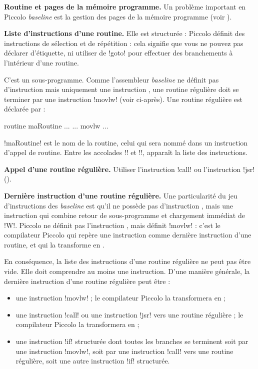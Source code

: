 \textbf{Routine et pages de la mémoire programme.} Un problème important en Piccolo \emph{baseline} est la gestion des pages de la mémoire programme (voir ).

\textbf{Liste d’instructions d’une routine.} Elle est structurée : Piccolo définit des instructions de sélection et de répétition : cela signifie que vous ne pouvez pas déclarer d’étiquette, ni utiliser de \pic!goto! pour effectuer des branchements à l’intérieur d’une routine.



C'est un sous-programme. Comme l'assembleur \emph{baseline} ne définit pas d'instruction  mais uniquement une instruction , une routine régulière doit se terminer par une instruction \pic!movlw! (voir ci-après). Une routine régulière est déclarée par :
\begin{piccolo}
routine maRoutine ... {
  ...
  movlw ...
}
\end{piccolo}

\pic!maRoutine! est le nom de la routine, celui qui sera nommé dans un instruction d’appel de routine. Entre les accolades \pic!{! et \pic!}!, apparaît la liste des instructions.

\textbf{Appel d’une routine régulière.} Utiliser l'instruction \pic!call! ou l'instruction \pic!jsr! ().

\textbf{Dernière instruction d’une routine régulière.} Une particularité du jeu d'instructions des \emph{baseline} est qu'il ne possède pas d'instruction , mais une instruction  qui combine retour de sous-programme et chargement immédiat de \pic!W!. Piccolo ne définit pas l'instruction , mais définit \pic!movlw! : c'est le compilateur Piccolo qui repère une instruction  comme dernière instruction d'une routine, et qui la transforme en .

En conséquence, la liste des instructions d'une routine régulière ne peut pas être vide. Elle doit comprendre au moins une instruction. D'une manière générale, la dernière instruction d'une routine régulière peut être :
\begin{itemize}
  \item une instruction \pic!movlw! ; le compilateur Piccolo la transformera en  ;
  \item une instruction \pic!call! ou une instruction \pic!jsr! vers une routine régulière ; le compilateur Piccolo la transformera en  ;
  \item une instruction \pic!if! structurée dont toutes les branches se terminent soit par une instruction \pic!movlw!, soit par une instruction \pic!call! vers une routine régulière, soit une autre instruction \pic!if! structurée.
\end{itemize}


